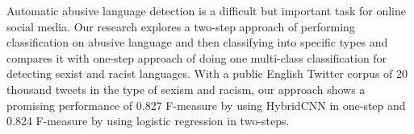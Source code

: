 Automatic abusive language detection is a difficult but important task for online social media. Our research explores a two-step approach of performing classification on abusive language and then classifying into specific types and compares it with one-step approach of doing one multi-class classification for detecting sexist and racist languages. With a public English Twitter corpus of 20 thousand tweets in the type of sexism and racism, our approach shows a promising performance of 0.827 F-measure by using HybridCNN in one-step and 0.824 F-measure by using logistic regression in two-steps.
